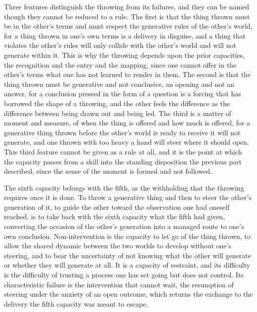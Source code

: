 Three features distinguish the throwing from its failures, and they can be named though they cannot be reduced to a rule. The first is that the thing thrown must be in the other's terms and must respect the generative rules of the other's world, for a thing thrown in one's own terms is a delivery in disguise, and a thing that violates the other's rules will only collide with the other's world and will not generate within it. This is why the throwing depends upon the prior capacities, the recognition and the entry and the mapping, since one cannot offer in the other's terms what one has not learned to render in them. The second is that the thing thrown must be generative and not conclusive, an opening and not an answer, for a conclusion pressed in the form of a question is a forcing that has borrowed the shape of a throwing, and the other feels the difference as the difference between being drawn out and being led. The third is a matter of moment and measure, of when the thing is offered and how much is offered, for a generative thing thrown before the other's world is ready to receive it will not generate, and one thrown with too heavy a hand will steer where it should open. This third feature cannot be given as a rule at all, and it is the point at which the capacity passes from a skill into the standing disposition the previous part described, since the sense of the moment is formed and not followed.

The sixth capacity belongs with the fifth, as the withholding that the throwing requires once it is done. To throw a generative thing and then to steer the other's generation of it, to guide the other toward the observation one had oneself reached, is to take back with the sixth capacity what the fifth had given, converting the occasion of the other's generation into a managed route to one's own conclusion. Non-intervention is the capacity to let go of the thing thrown, to allow the shared dynamic between the two worlds to develop without one's steering, and to bear the uncertainty of not knowing what the other will generate or whether they will generate at all. It is a capacity of restraint, and its difficulty is the difficulty of trusting a process one has set going but does not control. Its characteristic failure is the intervention that cannot wait, the resumption of steering under the anxiety of an open outcome, which returns the exchange to the delivery the fifth capacity was meant to escape.

